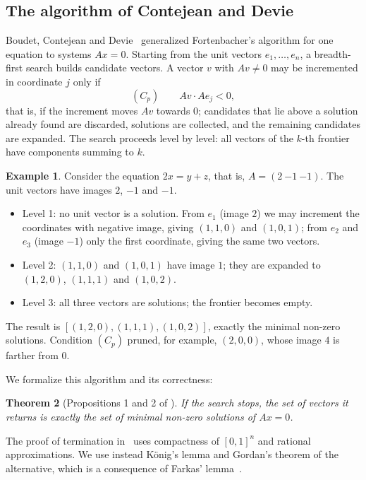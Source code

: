 \documentclass[11pt,a4paper]{article}
\newtheorem{theorem}{Theorem}[section]
\theoremstyle{definition}
\newtheorem{example}[theorem]{Example}
\theoremstyle{remark}
\begin{document}
\subsection{The algorithm of Contejean and Devie}

Boudet, Contejean and Devie~\cite{BCD90} generalized Fortenbacher's algorithm for one equation to
systems $Ax = 0$. Starting from the unit vectors $e_1,\dots,e_n$, a breadth-first search builds
candidate vectors. A vector $v$ with $Av \neq 0$ may be incremented in coordinate $j$ only if
\[
  (C_p)\qquad Av \cdot Ae_j < 0,
\]
that is, if the increment moves $Av$ towards $0$; candidates that lie above a solution already
found are discarded, solutions are collected, and the remaining candidates are expanded. The
search proceeds level by level: all vectors of the $k$-th frontier have components summing to
$k$.

\begin{example}\label{ex:cd}
  Consider the equation $2x = y + z$, that is, $A = (2\ {-1}\ {-1})$. The unit vectors have
  images $2$, $-1$ and $-1$.
  \begin{itemize}[nosep,leftmargin=*]
    \item Level 1: no unit vector is a solution. From $e_1$ (image $2$) we may increment the
          coordinates with negative image, giving $(1,1,0)$ and $(1,0,1)$; from $e_2$ and $e_3$
          (image $-1$) only the first coordinate, giving the same two vectors.
    \item Level 2: $(1,1,0)$ and $(1,0,1)$ have image $1$; they are expanded to $(1,2,0)$,
          $(1,1,1)$ and $(1,0,2)$.
    \item Level 3: all three vectors are solutions; the frontier becomes empty.
  \end{itemize}
  The result is $[(1,2,0), (1,1,1), (1,0,2)]$, exactly the minimal non-zero solutions.
  Condition $(C_p)$ pruned, for example, $(2,0,0)$, whose image $4$ is farther from $0$.
\end{example}

We formalize this algorithm and its correctness:

\begin{theorem}[Propositions 1 and 2 of \cite{BCD90}]
  If the search stops, the set of vectors it returns is exactly the set of minimal non-zero
  solutions of $Ax = 0$.
\end{theorem}

The proof of termination in~\cite{BCD90} uses compactness of $[0,1]^n$ and rational
approximations. We use instead König's lemma and Gordan's theorem of the alternative, which is a
consequence of Farkas' lemma~\cite{AFP-Farkas}.
\end{document}
